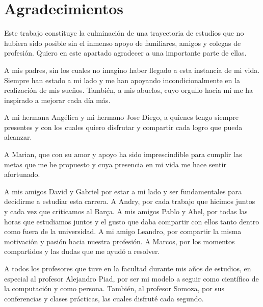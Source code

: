 \chapter*{Agradecimientos}\label{chapter:agradecimientos}

Este trabajo constituye la culminación de una trayectoria de estudios que no hubiera sido posible sin el inmenso apoyo de familiares, amigos y colegas de profesión. Quiero en este apartado agradecer a una importante parte de ellas.

	A mis padres, sin los cuales no imagino haber llegado a esta instancia de mi vida. Siempre han estado a mi lado y me han apoyando incondicionalmente en la realización de mis sueños. También, a mis abuelos, cuyo orgullo hacia mí me ha inspirado a mejorar cada día más.

	A mi hermana Angélica y mi hermano Jose Diego, a quienes tengo siempre presentes y con los cuales quiero disfrutar y compartir cada logro que pueda alcanzar.

	A Marian, que con su amor y apoyo ha sido imprescindible para cumplir las metas que me he propuesto y cuya presencia en mi vida me hace sentir afortunado.

	A mis amigos David y Gabriel por estar a mi lado y ser fundamentales para decidirme a estudiar esta carrera. A Andry, por cada trabajo que hicimos juntos y cada vez que criticamos al Barça. A mis amigos Pablo y Abel, por todas las horas que estudiamos juntos y el gusto que daba compartir con ellos tanto dentro como fuera de la universidad. A mi amigo Leandro, por compartir la misma motivación y pasión hacia nuestra profesión. A Marcos, por los momentos compartidos y las dudas que me ayudó a resolver.

	A todos los profesores que tuve en la facultad durante mis años de estudios, en especial al profesor Alejandro Piad, por ser mi modelo a seguir como científico de la computación y como persona. También, al profesor Somoza, por sus conferencias y clases prácticas, las cuales disfruté cada segundo.



